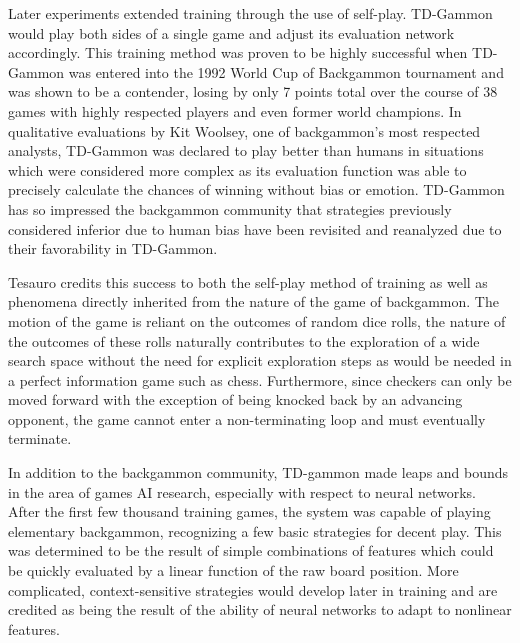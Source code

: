 Later experiments extended training through the use of self-play.
%
TD-Gammon would play both sides of a single game and adjust its evaluation
network accordingly.
%
This training method was proven to be highly successful when TD-Gammon was
entered into the 1992 World Cup of Backgammon tournament and was shown to be a
contender,
losing by only 7 points total over the course of 38 games with highly respected
players and even former world champions.
%
In qualitative evaluations by Kit Woolsey,
one of backgammon's most respected analysts,
TD-Gammon was declared to play better than humans in situations which were
considered more complex as its evaluation function was able to precisely
calculate the chances of winning without bias or emotion.
%
TD-Gammon has so impressed the backgammon community that strategies previously
considered inferior due to human bias have been revisited and reanalyzed due to
their favorability in TD-Gammon.

Tesauro credits this success to both the self-play method of training
as well as phenomena directly inherited from the nature of the game of
backgammon.
%
The motion of the game is reliant on the outcomes of random dice rolls,
the nature of the outcomes of these rolls naturally contributes to the
exploration of a wide search space without the need for explicit exploration
steps as would be needed in a perfect information game such as chess.
%
Furthermore,
since checkers can only be moved forward
with the exception of being knocked back by an advancing opponent,
the game cannot enter a non-terminating loop and must eventually
terminate.

In addition to the backgammon community,
TD-gammon made leaps and bounds in the area of games AI research,
especially with respect to neural networks.
%
After the first few thousand training games,
the system was capable of playing elementary backgammon,
recognizing a few basic strategies for decent play.
%
This was determined to be the result of simple combinations of features which
could be quickly evaluated by a linear function of the raw board position.
%
More complicated, context-sensitive strategies would develop later in training
and are credited as being the result of the ability of neural networks to adapt
to nonlinear features.


